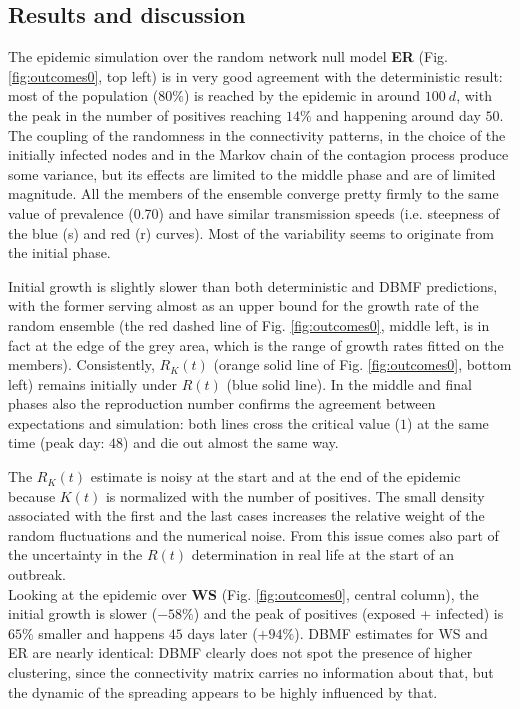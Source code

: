 \documentclass[DIV=12, BCOR=0pt]{scrartcl}  %
\begin{document}
  \subsection{Results and discussion}
  The epidemic simulation over the random network null model \textbf{ER} (Fig. \ref{fig:outcomes0}, top left) is in very good agreement with the deterministic result: most of the population ($80 \%$) is reached by the epidemic in around $100 \ d$, with the peak in the number of positives reaching $14 \%$ and happening around day $50$. The coupling of the randomness in the connectivity patterns, in the choice of the initially infected nodes and in the Markov chain of the contagion process produce some variance, but its effects are limited to the middle phase and are of limited magnitude. All the members of the ensemble converge pretty firmly to the same value of prevalence (0.70) and have similar transmission speeds (i.e. steepness of the blue (s) and red (r) curves). Most of the variability seems to originate from the initial phase.
  
  Initial growth is slightly slower than both deterministic and DBMF predictions, with the former serving almost as an upper bound for the growth rate of the random ensemble (the red dashed line of Fig. \ref{fig:outcomes0}, middle left, is in fact at the edge of the grey area, which is the range of growth rates fitted on the members). Consistently, $R_K(t)$ (orange solid line of Fig. \ref{fig:outcomes0}, bottom left) remains initially under $R(t)$ (blue solid line). In the middle and final phases also the reproduction number confirms the agreement between expectations and simulation: both lines cross the critical value ($1$) at the same time (peak day: $48$) and die out almost the same way.
  
  The $R_K(t)$ estimate is noisy at the start and at the end of the epidemic because $K(t)$ is normalized with the number of positives.
  The small density associated with the first and the last cases increases the relative weight of the random fluctuations and the numerical noise. From this issue comes also part of the uncertainty in the $R(t)$ determination in real life at the start of an outbreak.\\
  
  Looking at the epidemic over \textbf{WS} (Fig. \ref{fig:outcomes0}, central column), the initial growth is slower ($- 58 \%$) and the peak of positives (exposed + infected) is $65 \%$ smaller and happens $45$ days later ($+ 94 \%$). DBMF estimates for WS and ER are nearly identical: DBMF clearly does not spot the presence of higher clustering, since the connectivity matrix carries no information about that, but the dynamic of the spreading appears to be highly influenced by that.
  
\end{document}
